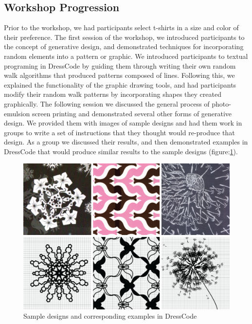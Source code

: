 \documentclass{sigchi}
\begin{document}
\subsection{Workshop Progression}
Prior to the workshop, we had participants select t-shirts in a size and color of their preference. The first session of the workshop, we introduced participants to the concept of generative design, and demonstrated techniques for incorporating random elements into a pattern or graphic. We introduced participants to textual programing in DressCode by guiding them through writing their own random walk algorithms that produced patterns composed of lines. Following this, we explained the functionality of the graphic drawing tools, and had participants modify their random walk patterns by incorporating shapes they created graphically. The following session we discussed the general process of photo-emulsion screen printing and demonstrated several other forms of generative design. We provided them with images of sample designs and had them work in groups to write a set of instructions that they thought would re-produce that design. As a group we discussed their results, and then demonstrated examples in DressCode that would produce similar results to the sample designs (figure:\ref{fig:example_designs}). 
\begin{center}
\begin{figure}[h!]
\includegraphics[width=\columnwidth]{images/pattern_examples.png}
\caption{Sample designs and corresponding examples in DressCode}
\label{fig:example_designs}
\end{figure}
\end{center}
\end{document}
